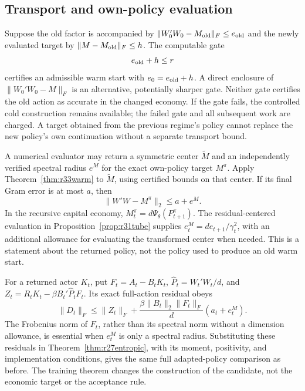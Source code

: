 \documentclass[ecta,nameyear,draft]{econsocart}
\theoremstyle{definition}
\theoremstyle{remark}
\begin{document}
\subsection{Transport and own-policy evaluation}
Suppose the old factor is accompanied by
$\|W_0'W_0-M_{\rm old}\|_F\leq e_{\rm old}$ and the newly evaluated target
by $\|M-M_{\rm old}\|_F\leq h$. The computable gate
\begin{equation}\label{eq:r33gate}
 e_{\rm old}+h\leq r
\end{equation}
certifies an admissible warm start with $e_0=e_{\rm old}+h$. A direct enclosure
of $\|W_0'W_0-M\|_F$ is an alternative, potentially sharper gate. Neither gate
certifies the old action as accurate in the changed economy. If the gate
fails, the controlled cold construction remains available; the failed gate
and all subsequent work are charged. A target obtained from the previous
regime's policy cannot replace the new policy's own continuation without a
separate transport bound.

A numerical evaluator may return a symmetric center $\widetilde M$ and an
independently verified spectral radius $e^M$ for the exact own-policy target
$M^\pi$. Apply Theorem~\ref{thm:r33warm} to $\widetilde M$, using certified
bounds on that center. If its final Gram error is at most $a$, then
\begin{equation}\label{eq:r33eval}
 \|W'W-M^\pi\|_2\leq a+e^M.
\end{equation}
In the recursive capital economy, $M_t^\pi=d\Psi_\theta(P_{t+1}^\pi)$.
The residual-centered evaluation in Proposition~\ref{prop:r31tube} supplies
$e_t^M=d e_{t+1}/\gamma_t^2$, with an additional allowance for evaluating the
transformed center when needed. This is a statement about the returned
policy, not the policy used to produce an old warm start.

For a returned actor $K_t$, put $F_t=A_t-B_tK_t$,
$\widehat P_t=W_t'W_t/d$, and
$Z_t=R_tK_t-\beta B_t'\widehat P_tF_t$. Its exact full-action residual obeys
\begin{equation}\label{eq:r33policy}
 \|D_t\|_F\leq\|Z_t\|_F+
 \frac{\beta\|B_t\|_2\|F_t\|_F}{d}(a_t+e_t^M).
\end{equation}
The Frobenius norm of $F_t$, rather than its spectral norm without a dimension
allowance, is essential when $e_t^M$ is only a spectral radius.
Substituting these residuals in Theorem~\ref{thm:r27entropic}, with its moment,
positivity, and implementation conditions, gives the same full adapted-policy
comparison as before. The training theorem changes the construction of the
candidate, not the economic target or the acceptance rule.
\end{document}
